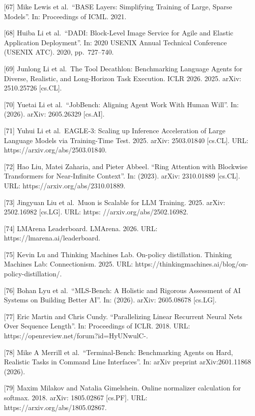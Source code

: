 \documentclass[
  10
]{article}
\begin{document}
{[}67{]} Mike Lewis et al.~``BASE Layers: Simplifying Training of Large,
Sparse Models''. In: Proceedings of ICML. 2021.

{[}68{]} Huiba Li et al.~``DADI: Block-Level Image Service for Agile and
Elastic Application Deployment''. In: 2020 USENIX Annual Technical
Conference (USENIX ATC). 2020, pp.~727--740.

{[}69{]} Junlong Li et al.~The Tool Decathlon: Benchmarking Language
Agents for Diverse, Realistic, and Long-Horizon Task Execution. ICLR
2026. 2025. arXiv: 2510.25726 {[}cs.CL{]}.

{[}70{]} Yuetai Li et al.~``JobBench: Aligning Agent Work With Human
Will''. In: (2026). arXiv: 2605.26329 {[}cs.AI{]}.

{[}71{]} Yuhui Li et al.~EAGLE-3: Scaling up Inference Acceleration of
Large Language Models via Training-Time Test. 2025. arXiv: 2503.01840
{[}cs.CL{]}. URL: https://arxiv.org/abs/2503.01840.

{[}72{]} Hao Liu, Matei Zaharia, and Pieter Abbeel. ``Ring Attention
with Blockwise Transformers for Near-Infinite Context''. In: (2023).
arXiv: 2310.01889 {[}cs.CL{]}. URL: https://arxiv.org/abs/2310.01889.

{[}73{]} Jingyuan Liu et al.~Muon is Scalable for LLM Training. 2025.
arXiv: 2502.16982 {[}cs.LG{]}. URL: https: //arxiv.org/abs/2502.16982.

{[}74{]} LMArena Leaderboard. LMArena. 2026. URL:
https://lmarena.ai/leaderboard.

{[}75{]} Kevin Lu and Thinking Machines Lab. On-policy distillation.
Thinking Machines Lab: Connectionism. 2025. URL:
https://thinkingmachines.ai/blog/on-policy-distillation/.

{[}76{]} Bohan Lyu et al.~``MLS-Bench: A Holistic and Rigorous
Assessment of AI Systems on Building Better AI''. In: (2026). arXiv:
2605.08678 {[}cs.LG{]}.

{[}77{]} Eric Martin and Chris Cundy. ``Parallelizing Linear Recurrent
Neural Nets Over Sequence Length''. In: Proceedings of ICLR. 2018. URL:
https://openreview.net/forum?id=HyUNwulC-.

{[}78{]} Mike A Merrill et al.~``Terminal-Bench: Benchmarking Agents on
Hard, Realistic Tasks in Command Line Interfaces''. In: arXiv preprint
arXiv:2601.11868 (2026).

{[}79{]} Maxim Milakov and Natalia Gimelshein. Online normalizer
calculation for softmax. 2018. arXiv: 1805.02867 {[}cs.PF{]}. URL:
https://arxiv.org/abs/1805.02867.
\end{document}
